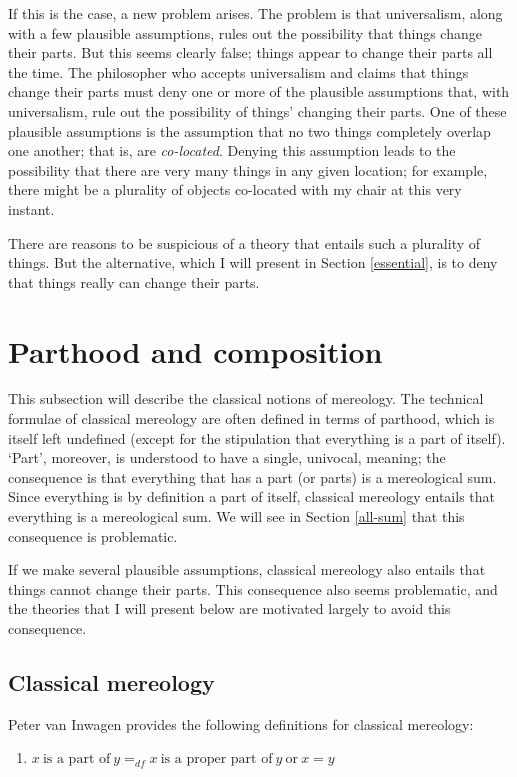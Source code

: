 \documentclass[12pt,twoside]{reedfancy}
\begin{document}
\begin{spacing}{1.25}
If this is the case, a new problem arises.  The problem is that
universalism, along with a few plausible assumptions, rules out the
possibility that things change their parts.  But this seems clearly
false; things appear to change their parts all the time.  The
philosopher who accepts universalism and claims that things change
their parts must deny one or more of the plausible assumptions that,
with universalism, rule out the possibility of things' changing their
parts.  One of these plausible assumptions is the assumption that no
two things completely overlap one another; that is, are {\em
  co-located}.  Denying this assumption leads to the possibility that
there are very many things in any given location; for example, there
might be a plurality of objects co-located with my chair at this very
instant.

There are reasons to be suspicious of a theory that entails such a
plurality of things.  But the alternative, which I will present in
Section \ref{essential}, is to deny that things really can change
their parts.

\section{Parthood and composition}
\label{part-comp}
This subsection will describe the classical notions of mereology.  The
technical formulae of classical mereology are often defined in terms
of parthood, which is itself left undefined (except for the
stipulation that everything is a part of itself).  `Part', moreover,
is understood to have a single, univocal, meaning; the consequence is
that everything that has a part (or parts) is a mereological sum.
Since everything is by definition a part of itself, classical
mereology entails that everything is a mereological sum.  We will see
in Section \ref{all-sum} that this consequence is problematic.

If we make several plausible assumptions, classical mereology also
entails that things cannot change their parts.  This consequence also
seems problematic, and the theories that I will present below are
motivated largely to avoid this consequence.

\subsection{Classical mereology}
\label{tech}
Peter van Inwagen provides the following definitions for classical
mereology:

\begin{enumerate}
  \item $x\ \text{is a part of}\ y =_{df} x\ \text{is a proper part
    of}\ y\ \text{or}\ x = y$
\end{enumerate}


\end{spacing}
\end{document}
